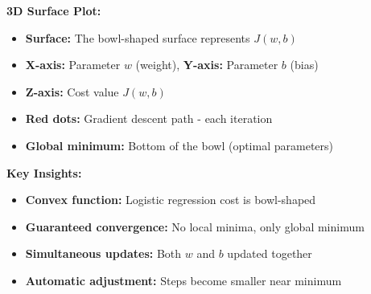 \documentclass[11pt,a4paper]{article}
\theoremstyle{definition}
\theoremstyle{remark}
\begin{document}
\vspace{0.4cm}

\begin{intuition}
\textbf{3D Surface Plot:}
\begin{itemize}
    \item \textbf{Surface:} The bowl-shaped surface represents $J(w,b)$
    \item \textbf{X-axis:} Parameter $w$ (weight), \textbf{Y-axis:} Parameter $b$ (bias)
    \item \textbf{Z-axis:} Cost value $J(w,b)$
    \item \textbf{Red dots:} Gradient descent path - each iteration
    \item \textbf{Global minimum:} Bottom of the bowl (optimal parameters)
\end{itemize}

\textbf{Key Insights:}
\begin{itemize}
    \item \textbf{Convex function:} Logistic regression cost is bowl-shaped
    \item \textbf{Guaranteed convergence:} No local minima, only global minimum
    \item \textbf{Simultaneous updates:} Both $w$ and $b$ updated together
    \item \textbf{Automatic adjustment:} Steps become smaller near minimum
\end{itemize}
\end{intuition}

\vspace{0.4cm}
\end{document}
